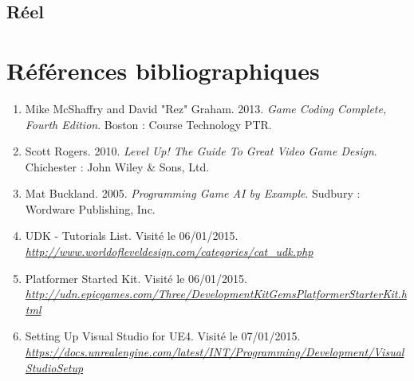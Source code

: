 \documentclass[11pt, a4paper, oneside]{article}
\begin{document}
\subsection{Réel}
\newpage
\section{Références bibliographiques}
\begin{enumerate}
\item Mike McShaffry and David "Rez" Graham. 2013. \textit{Game Coding Complete, Fourth Edition}. Boston : Course Technology PTR.
\item Scott Rogers. 2010. \textit{Level Up! The Guide To Great Video Game Design}. Chichester : John Wiley \& Sons, Ltd.
\item Mat Buckland. 2005. \textit{Programming Game AI by Example}. Sudbury : Wordware Publishing, Inc.
\item UDK - Tutorials List. Visité le 06/01/2015.\\\textit{\url{http://www.worldofleveldesign.com/categories/cat_udk.php}}
\item Platformer Started Kit.  Visité le 06/01/2015.\\\textit{\url{http://udn.epicgames.com/Three/DevelopmentKitGemsPlatformerStarterKit.html}}
\item Setting Up Visual Studio for UE4. Visité le 07/01/2015.\\\textit{\url{https://docs.unrealengine.com/latest/INT/Programming/Development/VisualStudioSetup}}
\end{enumerate}
\newpage
\listoffigures
\newpage
\listoftables
\end{document}
